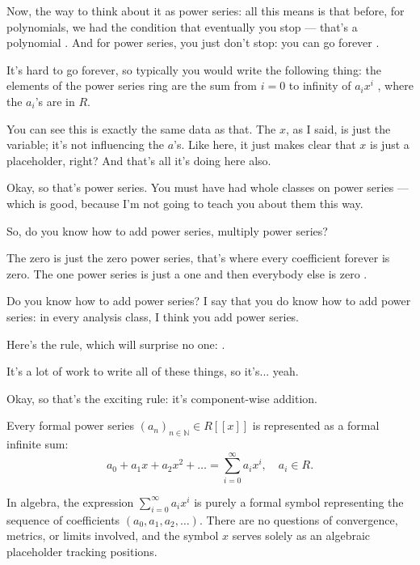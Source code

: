 \begin{speech}[00:27:02 - 00:29:00]
Now, the way to think about it as power series: all this means is that before, for polynomials, we had the condition that eventually you stop --- that's a polynomial . And for power series, you just don't stop: you can go forever .

It's hard to go forever, so typically you would write the following thing: the elements of the power series ring are the sum from $i = 0$ to infinity of $a_i x^i$ , where the $a_i$'s are in $R$.

You can see this is exactly the same data as that. The $x$, as I said, is just the variable; it's not influencing the $a$'s. Like here, it just makes clear that $x$ is just a placeholder, right? And that's all it's doing here also.

Okay, so that's power series. You must have had whole classes on power series --- which is good, because I'm not going to teach you about them this way.

So, do you know how to add power series, multiply power series?

The zero is just the zero power series, that's where every coefficient forever is zero. The one power series is just a one and then everybody else is zero .

Do you know how to add power series? I say that you do know how to add power series: in every analysis class, I think you add power series.

Here's the rule, which will surprise no one: .

It's a lot of work to write all of these things, so it's... yeah.

Okay, so that's the exciting rule: it's component-wise addition.
\end{speech}

\begin{content}
Every formal power series $(a_n)_{n \in \mathbb{N}} \in R[[x]]$ is represented as a formal infinite sum:
\begin{equation}\label{eq:power-series-sum-notation}
a_0 + a_1 x + a_2 x^2 + \dots = \sum_{i=0}^\infty a_i x^i, \quad a_i \in R.
\end{equation}

\begin{steps}
In algebra, the expression $\sum_{i=0}^\infty a_i x^i$ is purely a formal symbol representing the sequence of coefficients $(a_0, a_1, a_2, \dots)$. There are no questions of convergence, metrics, or limits involved, and the symbol $x$ serves solely as an algebraic placeholder tracking positions.
\end{steps}
\end{content}

